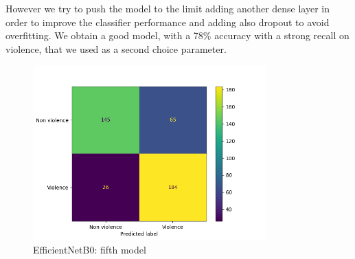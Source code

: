 However we try to push the model to the limit adding another dense layer in order to improve the classifier performance and adding also dropout to avoid overfitting.
We obtain a good model, with a 78\% accuracy with a strong recall on violence, that we used as a second choice parameter. 
\begin{figure}[h!]
    \centering
    \includegraphics[width=0.8\textwidth]{images/731a-EfficientNetB0_24-b2b1-conf_matrix.png}
    \caption{EfficientNetB0: fifth model}
    \label{fig:EfficientNetB0_24}
\end{figure}

\begin{table}[]
\centering
{}
\caption{EfficientNetB0 accuracy and recall}
\label{tab:EfficientNetB0 }
\end{table}
